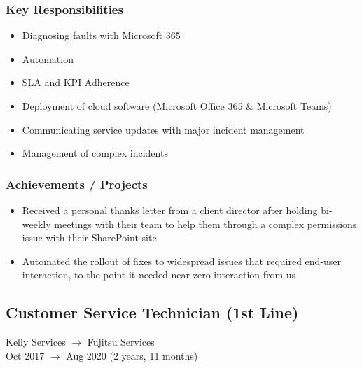 \documentclass{report}
\begin{document}
		\subsubsection*{Key Responsibilities}
			\begin{itemize}
				\setlength\itemsep{0pt}
				\item Diagnosing faults with Microsoft 365
				\item Automation
				\item SLA and KPI Adherence
				\item Deployment of cloud software (Microsoft Office 365 \& Microsoft Teams)
				\item Communicating service updates with major incident management
				\item Management of complex incidents
			\end{itemize}

		\subsubsection*{Achievements / Projects}
			\begin{itemize}
				\setlength\itemsep{0pt}
				\item Received a personal thanks letter from a client director after holding bi-weekly meetings with their team to help them through a complex permissions issue with their SharePoint site
				\item Automated the rollout of fixes to widespread issues that required end-user interaction, to the point it needed near-zero interaction from us
			\end{itemize}

	\subsection*{Customer Service Technician (1st Line)}
		Kelly Services $\rightarrow$ Fujitsu Services\\
		Oct 2017 $\rightarrow$ Aug 2020 (2 years, 11 months)
\end{document}

